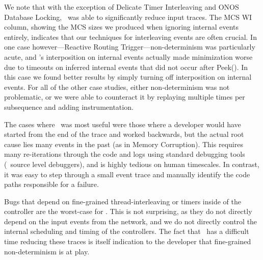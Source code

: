 We note that with the exception of Delicate Timer
Interleaving and ONOS Database Locking, \projectname~was able to significantly reduce input traces.
The MCS WI column, showing the MCS sizes we produced when ignoring internal events entirely,
indicates that our techniques for interleaving
events are often crucial.
In one case however---Reactive Routing Trigger---non-determinism was particularly
acute, and \projectname's interposition on internal
events actually made minimization worse due to timeouts on
inferred internal events that did not occur after {\sc
Peek()}. In this case we found
better results by simply turning off interposition on internal events.
For all of the other case studies, either non-determinism was not problematic, or we were able to
counteract it
by replaying multiple times per subsequence and adding instrumentation.

The cases where \projectname~was most useful were those where a developer would
have started from
the end of the trace and worked backwards, but
the actual root cause lies many events in the past (as in Memory Corruption).
This requires many re-iterations through the code and logs using standard
debugging tools (\eg~source level debuggers), and
is highly tedious on human timescales. In contrast, it was easy to step
through a small event trace and manually identify the code paths responsible
for a failure.

Bugs that depend on fine-grained thread-interleaving or timers
inside of the controller are the worst-case for \projectname. This
is not surprising, as they do not directly depend on the input events from the
network, and we do not directly control the internal scheduling and timing
of the controllers. The fact that \projectname~has a difficult time reducing
these traces is itself indication to the developer that fine-grained non-determinism is at
play.
